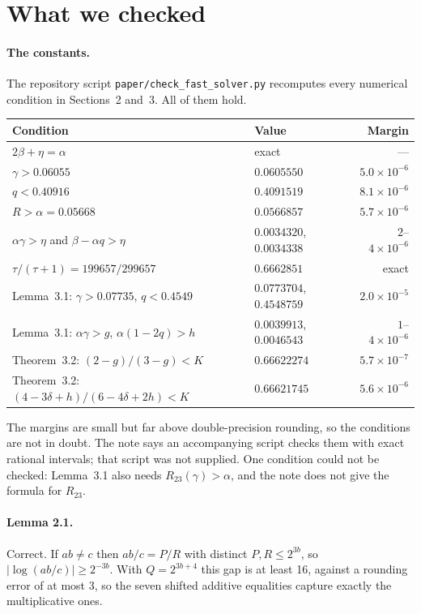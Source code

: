 \documentclass[11pt]{article}
\begin{document}
\section{What we checked}

\paragraph{The constants.}
The repository script \texttt{paper/check\_fast\_solver.py} recomputes every numerical condition in
Sections~2 and~3. All of them hold.

\begin{center}
\small
\begin{tabular}{@{}llr@{}}
\toprule
Condition & Value & Margin \\ \midrule
$2\beta + \eta = \alpha$ & exact & --- \\
$\gamma > 0.06055$ & $0.0605550$ & $5.0 \times 10^{-6}$ \\
$q < 0.40916$ & $0.4091519$ & $8.1 \times 10^{-6}$ \\
$R > \alpha = 0.05668$ & $0.0566857$ & $5.7 \times 10^{-6}$ \\
$\alpha\gamma > \eta$ and $\beta - \alpha q > \eta$ & $0.0034320$, $0.0034338$ & $2$--$4 \times 10^{-6}$ \\
$\tau/(\tau+1) = 199657/299657$ & $0.6662851$ & exact \\
Lemma~3.1: $\gamma > 0.07735$, $q < 0.4549$ & $0.0773704$, $0.4548759$ & $2.0 \times 10^{-5}$ \\
Lemma~3.1: $\alpha\gamma > g$, $\alpha(1 - 2q) > h$ & $0.0039913$, $0.0046543$ & $1$--$4 \times 10^{-6}$ \\
Theorem~3.2: $(2 - g)/(3 - g) < K$ & $0.66622274$ & $5.7 \times 10^{-7}$ \\
Theorem~3.2: $(4 - 3\delta + h)/(6 - 4\delta + 2h) < K$ & $0.66621745$ & $5.6 \times 10^{-6}$ \\
\bottomrule
\end{tabular}
\end{center}

The margins are small but far above double-precision rounding, so the conditions are not in doubt. The
note says an accompanying script checks them with exact rational intervals; that script was not supplied.
One condition could not be checked: Lemma~3.1 also needs $R_{23}(\gamma) > \alpha$, and the note does not
give the formula for $R_{23}$.

\paragraph{Lemma 2.1.}
Correct. If $ab \ne c$ then $ab/c = P/R$ with distinct $P, R \le 2^{3b}$, so
$|\log(ab/c)| \ge 2^{-3b}$. With $Q = 2^{3b+4}$ this gap is at least 16, against a rounding error of at
most 3, so the seven shifted additive equalities capture exactly the multiplicative ones.
\end{document}
